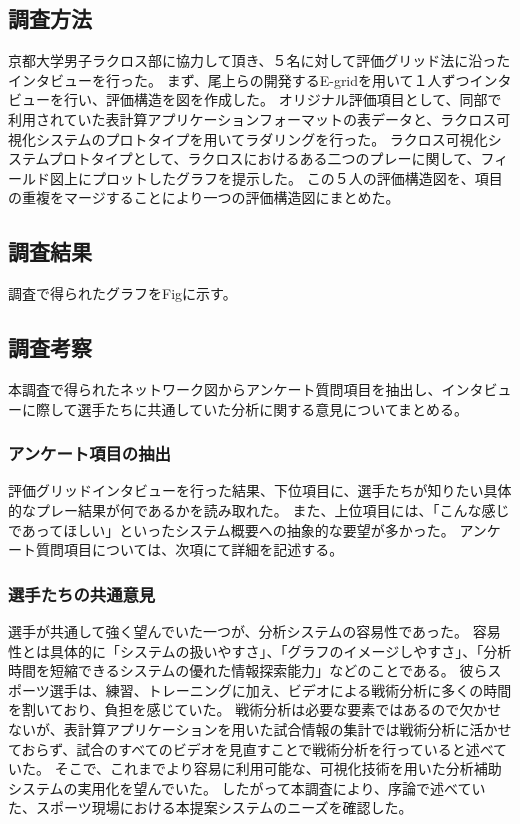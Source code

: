 \documentclass[sotsuron]{kuee}
\begin{document}
\subsection{調査方法}
京都大学男子ラクロス部に協力して頂き、５名に対して評価グリッド法に沿ったインタビューを行った。
まず、尾上らの開発するE-gridを用いて１人ずつインタビューを行い、評価構造を図を作成した。
オリジナル評価項目として、同部で利用されていた表計算アプリケーションフォーマットの表データと、ラクロス可視化システムのプロトタイプを用いてラダリングを行った。
ラクロス可視化システムプロトタイプとして、ラクロスにおけるある二つのプレーに関して、フィールド図上にプロットしたグラフを提示した。
この５人の評価構造図を、項目の重複をマージすることにより一つの評価構造図にまとめた。
\subsection{調査結果}
調査で得られたグラフをFigに示す。
\subsection{調査考察}
本調査で得られたネットワーク図からアンケート質問項目を抽出し、インタビューに際して選手たちに共通していた分析に関する意見についてまとめる。
\subsubsection{アンケート項目の抽出}
評価グリッドインタビューを行った結果、下位項目に、選手たちが知りたい具体的なプレー結果が何であるかを読み取れた。
また、上位項目には、「こんな感じであってほしい」といったシステム概要への抽象的な要望が多かった。
アンケート質問項目については、次項にて詳細を記述する。
\subsubsection{選手たちの共通意見}
選手が共通して強く望んでいた一つが、分析システムの容易性であった。
容易性とは具体的に「システムの扱いやすさ」、「グラフのイメージしやすさ」、「分析時間を短縮できるシステムの優れた情報探索能力」などのことである。
彼らスポーツ選手は、練習、トレーニングに加え、ビデオによる戦術分析に多くの時間を割いており、負担を感じていた。
戦術分析は必要な要素ではあるので欠かせないが、表計算アプリケーションを用いた試合情報の集計では戦術分析に活かせておらず、試合のすべてのビデオを見直すことで戦術分析を行っていると述べていた。
そこで、これまでより容易に利用可能な、可視化技術を用いた分析補助システムの実用化を望んでいた。
したがって本調査により、序論で述べていた、スポーツ現場における本提案システムのニーズを確認した。
\end{document}
